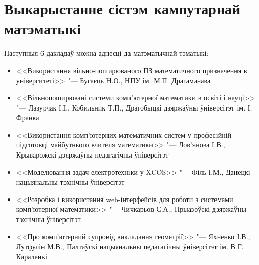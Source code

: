 \documentclass[10pt, a5paper]{article}
\begin{document}
\section*{Выкарыстанне сістэм кампутарнай матэматыкі}
Наступныя 6 дакладаў можна аднесці да матэматычнай тэматыкі:
\begin{itemize}
\item <<Використання вільно-поширюваного ПЗ математичного призначення в університеті>> "--- Бугаєць Н.О., НПУ ім. М.П. Драгаманава
\item <<Вільнопоширювані системи комп'ютерної математики в осві\-ті і науці>> "--- Лазурчак І.І., Кобильник Т.П., Драгобыцкі дзяржаўны ўніверсітэт ім. І. Франка
\item <<Використання комп'ютерних математичних систем у про\-фе\-сій\-ній підготовці майбутнього вчителя математики>> "--- Лов'я\-но\-ва І.В., Крыварожскі дзяржаўны педагагічны ўніверсітэт
\item <<Моделювання задач електротехніки у XCOS>> "--- Філь І.М., Данецкі нацыянальны тэхнічны ўніверсітэт
\item <<Розробка і використання web-інтерфейсів для роботи з системами комп'ютерної математики>> "--- Чичкарьов Є.А., Прыазоўскі дзяржаўны тэхнічны ўніверсітэт
\item <<Про комп'ютерний супровід викладання геометрії>> "--- Яхненко І.В., Лутфулін М.В., Палтаўскі нацыянальны педагагічны ўніверсітэт ім. В.Г. Караленкі
\end{itemize}
\end{document}
